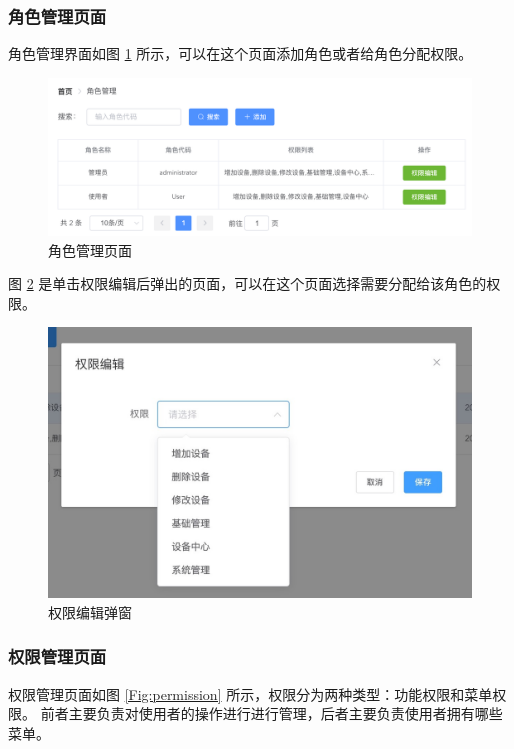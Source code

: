 \subsubsection{角色管理页面}
角色管理界面如图 \ref{Fig:role} 所示，可以在这个页面添加角色或者给角色分配权限。

\begin{figure}[ht]
    \centering
    \includegraphics[width=1\linewidth]{./Figure/IMG_role.png}
    \caption{角色管理页面}\label{Fig:role}
\end{figure}

图 \ref{Fig:add_permission} 是单击权限编辑后弹出的页面，可以在这个页面选择需要分配给该角色的权限。

\begin{figure}[ht]
    \centering
    \includegraphics[width=.8\linewidth]{./Figure/IMG_add_permission.png}
    \caption{权限编辑弹窗}\label{Fig:add_permission}
\end{figure}

\subsubsection{权限管理页面}

权限管理页面如图 \ref{Fig:permission} 所示，权限分为两种类型：功能权限和菜单权限。
前者主要负责对使用者的操作进行进行管理，后者主要负责使用者拥有哪些菜单。

